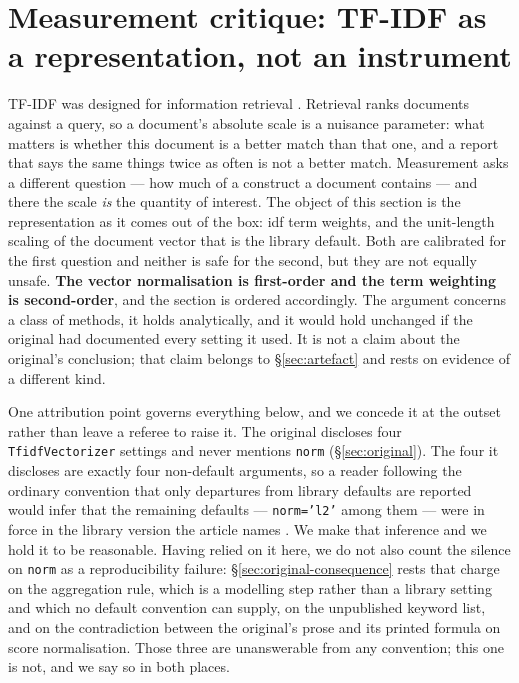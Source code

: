 \section{Measurement critique: TF-IDF as a representation, not an instrument}
\label{sec:measurement}

TF-IDF was designed for information retrieval \citep{sparckjones1972,manning2008}.
Retrieval ranks documents against a query, so a document's absolute scale is a nuisance
parameter: what matters is whether this document is a better match than that one, and a
report that says the same things twice as often is not a better match. Measurement asks a
different question --- how much of a construct a document contains --- and there the scale
\emph{is} the quantity of interest. The object of this section is the representation as it
comes out of the box: idf term weights, and the unit-length scaling of the document vector
that is the library default. Both are calibrated for the first question and neither is safe
for the second, but they are not equally unsafe. \textbf{The vector normalisation is
first-order and the term weighting is second-order}, and the section is ordered accordingly.
The argument concerns a class of methods, it holds analytically, and it would hold unchanged
if the original had documented every setting it used. It is not a claim about the original's
conclusion; that claim belongs to \S\ref{sec:artefact} and rests on evidence of a different
kind.

One attribution point governs everything below, and we concede it at the outset rather than
leave a referee to raise it. The original \citep{lagasio2024} discloses four
\texttt{TfidfVectorizer} settings and never mentions \texttt{norm} (\S\ref{sec:original}).
The four it discloses are exactly four non-default arguments, so a reader following the
ordinary convention that only departures from library defaults are reported would infer that
the remaining defaults --- \texttt{norm='l2'} among them --- were in force in the library
version the article names \citep{pedregosa2011}. We make that inference and we hold it to be
reasonable. Having relied on it here, we do not also count the silence on \texttt{norm} as a
reproducibility failure: \S\ref{sec:original-consequence} rests that charge on the
aggregation rule, which is a modelling step rather than a library setting and which no
default convention can supply, on the unpublished keyword list, and on the contradiction
between the original's prose and its printed formula on score normalisation. Those three are
unanswerable from any convention; this one is not, and we say so in both places.

